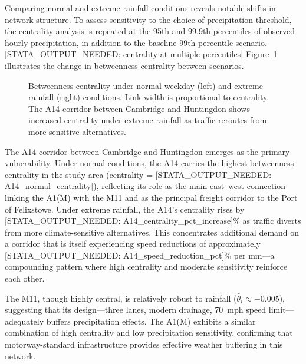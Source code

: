 \documentclass[review]{elsarticle}
\begin{document}
Comparing normal and extreme-rainfall conditions reveals notable shifts in network structure. To assess sensitivity to the choice of precipitation threshold, the centrality analysis is repeated at the 95th and 99.9th percentiles of observed hourly precipitation, in addition to the baseline 99th percentile scenario. [STATA\_OUTPUT\_NEEDED: centrality at multiple percentiles] Figure~\ref{fig:centrality} illustrates the change in betweenness centrality between scenarios.

\begin{figure}[htbp]
\centering
\caption{Betweenness centrality under normal weekday (left) and extreme rainfall (right) conditions. Link width is proportional to centrality. The A14 corridor between Cambridge and Huntingdon shows increased centrality under extreme rainfall as traffic reroutes from more sensitive alternatives.}
\label{fig:centrality}
\end{figure}

The A14 corridor between Cambridge and Huntingdon emerges as the primary vulnerability. Under normal conditions, the A14 carries the highest betweenness centrality in the study area (centrality = [STATA\_OUTPUT\_NEEDED: A14\_normal\_centrality]), reflecting its role as the main east--west connection linking the A1(M) with the M11 and as the principal freight corridor to the Port of Felixstowe. Under extreme rainfall, the A14's centrality rises by [STATA\_OUTPUT\_NEEDED: A14\_centrality\_pct\_increase]\% as traffic diverts from more climate-sensitive alternatives. This concentrates additional demand on a corridor that is itself experiencing speed reductions of approximately [STATA\_OUTPUT\_NEEDED: A14\_speed\_reduction\_pct]\% per mm---a compounding pattern where high centrality and moderate sensitivity reinforce each other.

The M11, though highly central, is relatively robust to rainfall ($\hat{\theta}_i \approx -0.005$), suggesting that its design---three lanes, modern drainage, 70~mph speed limit---adequately buffers precipitation effects. The A1(M) exhibits a similar combination of high centrality and low precipitation sensitivity, confirming that motorway-standard infrastructure provides effective weather buffering in this network.
\end{document}
